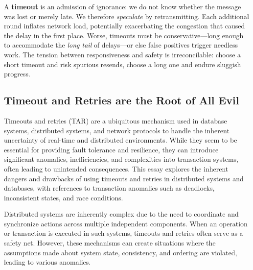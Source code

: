 \documentclass[../../../OAE-SPEC-MAIN.tex]{subfiles}
\begin{document}
A \textbf{timeout} is an admission of ignorance: we do not know whether the message was lost or merely late.  We therefore \emph{speculate} by retransmitting.  Each additional round inflates network load, potentially exacerbating the congestion that caused the delay in the first place.  Worse, timeouts must be conservative---long enough to accommodate the \emph{long tail} of delays---or else false positives trigger needless work.  The tension between responsiveness and safety is irreconcilable: choose a short timeout and risk spurious resends, choose a long one and endure sluggish progress.


\subsection*{Timeout and Retries are the Root of All Evil}

Timeouts and retries (TAR) are a ubiquitous mechanism used in database systems, distributed systems, and network protocols to handle the inherent uncertainty of real-time and distributed environments. While they seem to be essential for providing fault tolerance and resilience, they can introduce significant anomalies, inefficiencies, and complexities into transaction systems, often leading to unintended consequences. This essay explores the inherent dangers and drawbacks of using timeouts and retries in distributed systems and databases, with references to transaction anomalies such as deadlocks, inconsistent states, and race conditions.

Distributed systems are inherently complex due to the need to coordinate and synchronize actions across multiple independent components. When an operation or transaction is executed in such systems, timeouts and retries often serve as a safety net. However, these mechanisms can create situations where the assumptions made about system state, consistency, and ordering are violated, leading to various anomalies.
\end{document}
